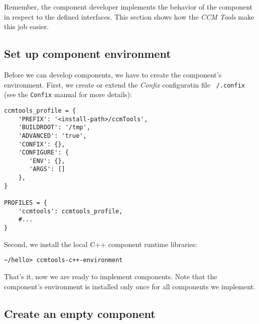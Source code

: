 Remember, the component developer implements the behavior of the component in
respect to the defined interfaces. This section shows how the {\it CCM Tools}
make this job easier.

\subsection{Set up component environment}

Before we can develop components, we have to create the component's environment.
First, we create or extend the {\it Confix} configuratin file {\tt ~/.confix}
(see the {\tt Confix} manual for more details):
\begin{verbatim}
ccmtools_profile = {
    'PREFIX': '<install-path>/ccmTools',
    'BUILDROOT': '/tmp',
    'ADVANCED': 'true',
    'CONFIX': {},
    'CONFIGURE': {
       'ENV': {},
       'ARGS': []
    },
}
    
PROFILES = {
    'ccmtools': ccmtools_profile,
    #...
}
\end{verbatim}

\noindent
Second, we install the local C++ component runtime libraries:
\begin{verbatim}
~/hello> ccmtools-c++-environment
\end{verbatim}

\noindent
That's it, now we are ready to implement components.
Note that the component's environment is installed only once for all 
components we implement.


\subsection{Create an empty component}

